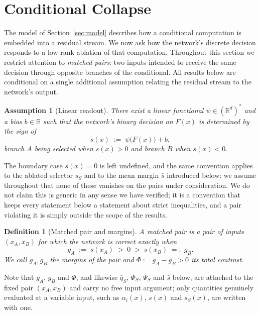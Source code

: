 \documentclass[11pt,a4paper]{article}
\newtheorem{definition}{Definition}
\newtheorem{assumption}{Assumption}
\begin{document}
\section{Conditional Collapse}
\label{sec:collapse}

The model of Section~\ref{sec:model} describes how a conditional computation is
embedded into a residual stream. We now ask how the network's discrete decision
responds to a low-rank ablation of that computation. Throughout this section we
restrict attention to \emph{matched pairs}: two inputs intended to receive the
same decision through opposite branches of the conditional. All results below
are conditional on a single additional assumption relating the residual stream
to the network's output.

\begin{assumption}[Linear readout]
\label{ass:readout}
There exist a linear functional $\psi\in(\mathbb R^d)^*$ and a bias
$b\in\mathbb R$ such that the network's binary decision on $F(x)$ is determined
by the sign of
\[
s(x) \;:=\; \psi\bigl(F(x)\bigr) + b,
\]
branch $A$ being selected when $s(x)>0$ and branch $B$ when $s(x)<0$.
\end{assumption}

The boundary case $s(x)=0$ is left undefined, and the same convention applies
to the ablated selector $s_S$ and to the mean margin $\bar s$ introduced
below: we assume throughout that none of these vanishes on the pairs under
consideration. We do not claim this is generic in any sense we have verified;
it is a convention that keeps every statement below a statement about strict
inequalities, and a pair violating it is simply outside the scope of the
results.

\begin{definition}[Matched pair and margins]
\label{def:pair}
A \emph{matched pair} is a pair of inputs $(x_A,x_B)$ for which the network is
correct exactly when
\[
g_A \;:=\; s(x_A) \;>\; 0 \;>\; s(x_B) \;=:\; g_B .
\]
We call $g_A,g_B$ the \emph{margins} of the pair and
$\Phi:=g_A-g_B>0$ its \emph{total contrast}.
\end{definition}

Note that $g_A$, $g_B$ and $\Phi$, and likewise $\bar q_S$, $\Phi_S$,
$\Psi_S$ and $\bar s$ below, are attached to the fixed pair $(x_A,x_B)$ and
carry no free input argument; only quantities genuinely evaluated at a
variable input, such as $\alpha_i(x)$, $s(x)$ and $s_S(x)$, are written with
one.
\end{document}
